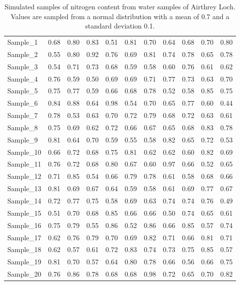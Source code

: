 \documentclass[
]{scrbook}
\begin{document}
\begin{longtable}[]{@{}lrrrrrrrrrr@{}}
\caption{\label{tab:unnamed-chunk-41}Simulated samples of nitrogen content from water samples of Airthrey Loch. Values are sampled from a normal distribution with a mean of 0.7 and a standard deviation 0.1.}\tabularnewline
\toprule
\endhead
Sample\_1 & 0.68 & 0.80 & 0.83 & 0.51 & 0.81 & 0.70 & 0.64 & 0.68 & 0.70 & 0.80 \\
Sample\_2 & 0.55 & 0.80 & 0.92 & 0.76 & 0.69 & 0.81 & 0.74 & 0.78 & 0.65 & 0.78 \\
Sample\_3 & 0.54 & 0.71 & 0.73 & 0.68 & 0.59 & 0.58 & 0.60 & 0.76 & 0.61 & 0.62 \\
Sample\_4 & 0.76 & 0.59 & 0.50 & 0.69 & 0.69 & 0.71 & 0.77 & 0.73 & 0.63 & 0.70 \\
Sample\_5 & 0.75 & 0.77 & 0.59 & 0.66 & 0.68 & 0.78 & 0.52 & 0.58 & 0.85 & 0.75 \\
Sample\_6 & 0.84 & 0.88 & 0.64 & 0.98 & 0.54 & 0.70 & 0.65 & 0.77 & 0.60 & 0.44 \\
Sample\_7 & 0.78 & 0.53 & 0.63 & 0.70 & 0.72 & 0.79 & 0.68 & 0.72 & 0.63 & 0.61 \\
Sample\_8 & 0.75 & 0.69 & 0.62 & 0.72 & 0.66 & 0.67 & 0.65 & 0.68 & 0.83 & 0.78 \\
Sample\_9 & 0.81 & 0.64 & 0.70 & 0.59 & 0.55 & 0.58 & 0.82 & 0.65 & 0.72 & 0.53 \\
Sample\_10 & 0.66 & 0.72 & 0.68 & 0.75 & 0.81 & 0.62 & 0.62 & 0.60 & 0.82 & 0.69 \\
Sample\_11 & 0.76 & 0.72 & 0.68 & 0.80 & 0.67 & 0.60 & 0.97 & 0.66 & 0.52 & 0.65 \\
Sample\_12 & 0.71 & 0.85 & 0.54 & 0.66 & 0.79 & 0.78 & 0.61 & 0.58 & 0.68 & 0.66 \\
Sample\_13 & 0.81 & 0.69 & 0.67 & 0.64 & 0.59 & 0.58 & 0.61 & 0.69 & 0.77 & 0.67 \\
Sample\_14 & 0.72 & 0.77 & 0.75 & 0.58 & 0.69 & 0.63 & 0.74 & 0.74 & 0.76 & 0.49 \\
Sample\_15 & 0.51 & 0.70 & 0.68 & 0.85 & 0.66 & 0.66 & 0.50 & 0.74 & 0.65 & 0.61 \\
Sample\_16 & 0.75 & 0.79 & 0.55 & 0.86 & 0.52 & 0.86 & 0.66 & 0.85 & 0.57 & 0.74 \\
Sample\_17 & 0.62 & 0.76 & 0.79 & 0.70 & 0.69 & 0.82 & 0.71 & 0.66 & 0.81 & 0.71 \\
Sample\_18 & 0.62 & 0.57 & 0.61 & 0.72 & 0.83 & 0.74 & 0.73 & 0.75 & 0.85 & 0.57 \\
Sample\_19 & 0.81 & 0.70 & 0.57 & 0.64 & 0.80 & 0.78 & 0.66 & 0.56 & 0.66 & 0.75 \\
Sample\_20 & 0.76 & 0.86 & 0.78 & 0.68 & 0.68 & 0.98 & 0.72 & 0.65 & 0.70 & 0.82 \\
\bottomrule
\end{longtable}
\end{document}

